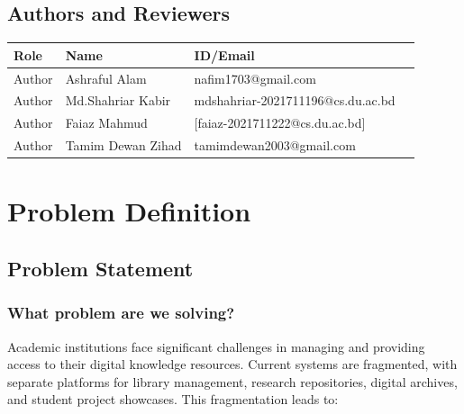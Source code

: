 \documentclass[12pt,a4paper]{report}
\begin{document}
\section{Authors and Reviewers}
\begin{table}[h]
\centering
\begin{tabular}{|l|l|l|l|}
\hline
\textbf{Role} & \textbf{Name} & \textbf{ID/Email} \\ \hline
Author & Ashraful Alam & nafim1703@gmail.com \\ \hline
Author & Md.Shahriar Kabir & mdshahriar-2021711196@cs.du.ac.bd \\ \hline
Author & Faiaz Mahmud & [faiaz-2021711222@cs.du.ac.bd] \\ \hline
Author & Tamim Dewan Zihad & tamimdewan2003@gmail.com \\ \hline

\end{tabular}
\end{table}


\chapter{Problem Definition}

\section{Problem Statement}

\subsection{What problem are we solving?}

Academic institutions face significant challenges in managing and providing access to their digital knowledge resources. Current systems are fragmented, with separate platforms for library management, research repositories, digital archives, and student project showcases. This fragmentation leads to:
\end{document}

